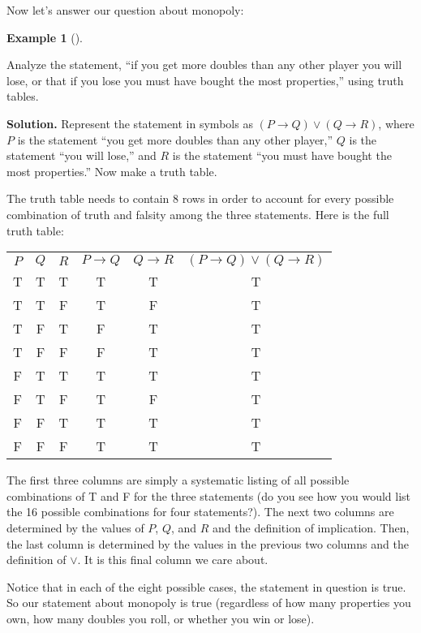 \documentclass[10pt,]{book}
\theoremstyle{plain}
\theoremstyle{definition}
\newtheorem{example}[theorem]{Example}
\theoremstyle{definition}
\theoremstyle{definition}
\numberwithin{equation}{chapter}
\newcommand{\hrulethin}  {\noalign{\hrule height 0.04em}}
\def\imp{\rightarrow}
\begin{document}
          Now let's answer our question about monopoly:
\begin{example}[]\label{example-84}

              Analyze the statement, ``if you get more doubles than any other player you will lose, or that if you lose you must have bought the most properties,'' using truth tables.
\par\medskip\noindent%
\textbf{Solution.}\quad
              Represent the statement in symbols as \((P \imp Q) \vee (Q \imp R)\), where \(P\) is the statement ``you get more doubles than any other player,'' \(Q\) is the statement ``you will lose,'' and \(R\) is the statement ``you must have bought the most properties.'' Now make a truth table.
\par

              The truth table needs to contain 8 rows in order to account for every possible combination of truth and falsity among the three statements. Here is the full truth table:
\leavevmode%
\begin{table}
\centering
\begin{tabular}{cccccc}
\(P\)&\(Q\)&\(R\)&\(P \imp Q\)&\(Q \imp R\)&\((P \imp Q) \vee (Q \imp R)\)\tabularnewline\hrulethin
T&T&T&T&T&T\tabularnewline[0pt]
T&T&F&T&F&T\tabularnewline[0pt]
T&F&T&F&T&T\tabularnewline[0pt]
T&F&F&F&T&T\tabularnewline[0pt]
F&T&T&T&T&T\tabularnewline[0pt]
F&T&F&T&F&T\tabularnewline[0pt]
F&F&T&T&T&T\tabularnewline[0pt]
F&F&F&T&T&T
\end{tabular}
\end{table}
\par

              The first three columns are simply a systematic listing of all possible combinations of T and F for the three statements (do you see how you would list the 16 possible combinations for four statements?). The next two columns are determined by the values of \(P\), \(Q\), and \(R\) and the definition of implication. Then, the last column is determined by the values in the previous two columns and the definition of \(\vee\). It is this final column we care about.
\par

              Notice that in each of the eight possible cases, the statement in question is true. So our statement about monopoly is true (regardless of how many properties you own, how many doubles you roll, or whether you win or lose).
\end{example}
\par
\end{document}
